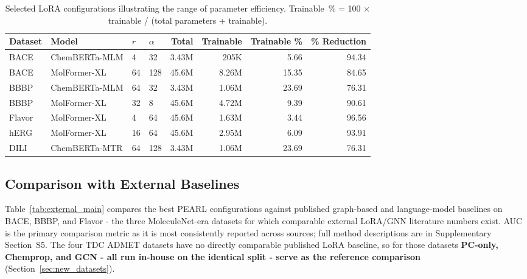 \documentclass[final,1p,times]{elsarticle}
\begin{document}
\begin{table}[!ht]
\centering
\caption{Selected LoRA configurations illustrating the range of parameter efficiency. Trainable~\% = 100 $\times$ trainable / (total parameters + trainable).}
\label{tab:params}
\begin{tabular}{llllrrrr}
\toprule
Dataset & Model & $r$ & $\alpha$ & Total & Trainable & Trainable \% & \% Reduction \\
\midrule
BACE   & ChemBERTa-MLM & 4  & 32  & 3.43M & 205K  & 5.66  & 94.34 \\
BACE   & MolFormer-XL  & 64 & 128 & 45.6M & 8.26M & 15.35 & 84.65 \\
BBBP   & ChemBERTa-MLM & 64 & 32  & 3.43M & 1.06M & 23.69 & 76.31 \\
BBBP   & MolFormer-XL  & 32 & 8   & 45.6M & 4.72M & 9.39  & 90.61 \\
Flavor & MolFormer-XL  & 4  & 64  & 45.6M & 1.63M & 3.44  & 96.56 \\
hERG   & MolFormer-XL  & 16 & 64  & 45.6M & 2.95M & 6.09  & 93.91 \\
DILI   & ChemBERTa-MTR & 64 & 128 & 3.43M & 1.06M & 23.69 & 76.31 \\
\bottomrule
\end{tabular}
\end{table}

\subsection{Comparison with External Baselines}\label{sec:external_comparison}
Table~\ref{tab:external_main} compares the best PEARL configurations against published graph-based and language-model baselines on BACE, BBBP, and Flavor - the three MoleculeNet-era datasets for which comparable external LoRA/GNN literature numbers exist. AUC is the primary comparison metric as it is most consistently reported across sources; full method descriptions are in Supplementary Section~S5. The four TDC ADMET datasets have no directly comparable published LoRA baseline, so for those datasets \textbf{PC-only, Chemprop, and GCN - all run in-house on the identical split - serve as the reference comparison} (Section~\ref{sec:new_datasets}).
\end{document}
